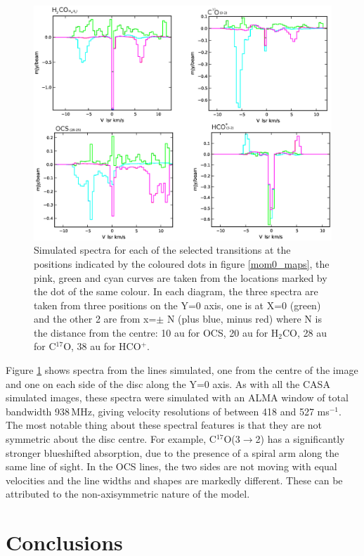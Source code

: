 \documentclass[useAMS,usenatbib]{mn2e}
\begin{document}
\begin{figure}
 \includegraphics[width=168mm]{Figures/sim/casa_all_spectra2.eps}
 \caption{Simulated spectra for each of the selected transitions at the positions indicated by the coloured dots in figure \ref{mom0_maps}, the pink, green and cyan curves are taken from the locations marked by the dot of the same colour. In each diagram, the three spectra are taken from three positions on the Y=0 axis, one is at X=0 (green) and the other 2 are from x=$\pm$ N (plus blue, minus red) where N is the distance from the centre: 10 au for OCS, 20 au for H$_2$CO, 28 au for C$^{17}$O, 38 au for HCO$^+$.}
 \label{spectra}
\end{figure}

Figure \ref{spectra} shows spectra from the lines simulated, one from the centre of the image and one on each side of the disc along the Y=0 axis. As with all the CASA simulated images, these spectra were simulated with an ALMA window of total bandwidth 938$\,$MHz, giving velocity resolutions of between 418 and 527 ms$^{-1}$. The most notable thing about these spectral features is that they are not symmetric about the disc centre. For example, C$^{17}$O(3$\rightarrow$2) has a significantly stronger blueshifted absorption, due to the presence of a spiral arm along the same line of sight. In the OCS lines, the two sides are not moving with equal velocities and the line widths and shapes are markedly different. These can be attributed to the non-axisymmetric nature of the model.

\section{Conclusions} \label{sec:discussion}
\end{document}
